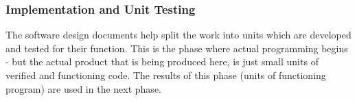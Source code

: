 \subsubsection{Implementation and Unit Testing}

The software design documents help split the work into units which are developed and tested 
for their function. This is the phase where actual programming begins - but the
actual product that is being produced here, is just small units of verified and
functioning code\cite{waterfallexplained}. The results of this phase 
(units of functioning program) are 
used in the next phase\cite{waterfallexplained}.